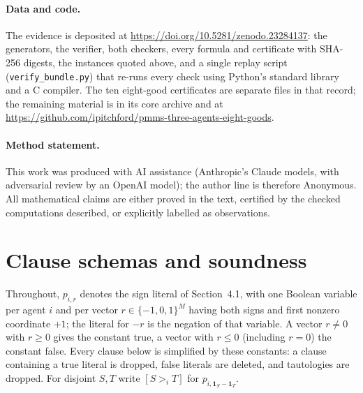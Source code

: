 \documentclass[11pt,a4paper]{article}
\theoremstyle{remark}
\begin{document}
\paragraph{Data and code.} The evidence is deposited at \url{https://doi.org/10.5281/zenodo.23284137}: the generators, the verifier, both checkers, every formula and certificate with SHA-256 digests, the instances quoted above, and a single replay script (\texttt{verify\_bundle.py}) that re-runs every check using Python's standard library and a C compiler. The ten eight-good certificates are separate files in that record; the remaining material is in its core archive and at \url{https://github.com/ipitchford/pmms-three-agents-eight-goods}.

\paragraph{Method statement.} This work was produced with AI assistance (Anthropic's Claude models, with adversarial review by an OpenAI model); the author line is therefore Anonymous. All mathematical claims are either proved in the text, certified by the checked computations described, or explicitly labelled as observations.


\appendix
\section{Clause schemas and soundness}\label{app:clauses}

Throughout, $p_{i,r}$ denotes the sign literal of Section~4.1, with one Boolean variable per agent $i$ and per vector $r\in\{-1,0,1\}^M$ having both signs and first nonzero coordinate $+1$; the literal for $-r$ is the negation of that variable. A vector $r\ne0$ with $r\ge0$ gives the constant true, a vector with $r\le0$ (including $r=0$) the constant false. Every clause below is simplified by these constants: a clause containing a true literal is dropped, false literals are deleted, and tautologies are dropped. For disjoint $S,T$ write $[S>_iT]$ for $p_{i,\mathbf1_S-\mathbf1_T}$.
\end{document}
